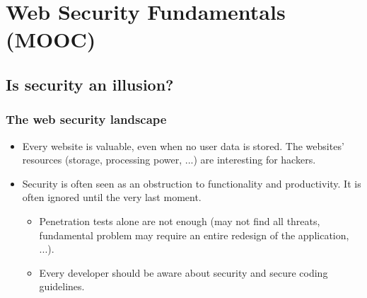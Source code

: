\documentclass[12pt,titlepage,a4paper]{report}
\begin{document}
	\chapter{Web Security Fundamentals (MOOC)}
	\section{Is security an illusion?}
	\subsection{The web security landscape}
	\begin{itemize}
		\item Every website is valuable, even when no user data is stored. The websites' resources (storage, processing power, ...) are interesting for hackers.
		\item Security is often seen as an obstruction to functionality and productivity. It is often ignored until the very last moment.
		\begin{itemize}
			\item Penetration tests alone are not enough (may not find all threats, fundamental problem may require an entire redesign of the application, ...).
			\item Every developer should be aware about security and secure coding guidelines.
		\end{itemize}
	\end{itemize}
\end{document}
